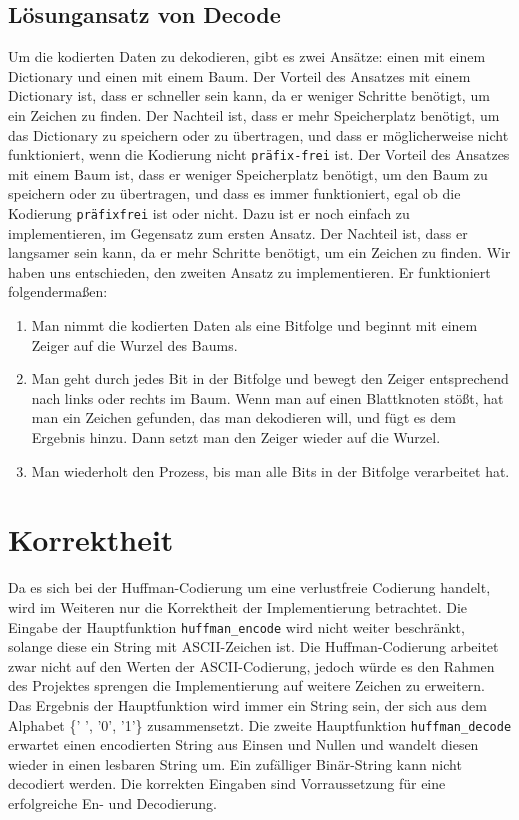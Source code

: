 \documentclass[course=erap]{aspdoc}
\begin{document}
\subsection{Lösungansatz von Decode}\label{Decode}
Um die kodierten Daten zu dekodieren, gibt es zwei Ansätze: einen mit einem Dictionary und einen mit einem Baum.
Der Vorteil des Ansatzes mit einem Dictionary ist, dass er schneller sein kann, da er weniger Schritte benötigt, um ein Zeichen zu finden. Der Nachteil ist, dass er mehr Speicherplatz benötigt, um das Dictionary zu speichern oder zu übertragen, und dass er möglicherweise nicht funktioniert, wenn die Kodierung nicht \verb+präfix-frei+ ist. Der Vorteil des Ansatzes mit einem Baum ist, dass er weniger Speicherplatz benötigt, um den Baum zu speichern oder zu übertragen, und dass es immer funktioniert, egal ob die Kodierung \verb+präfixfrei+ ist oder nicht. Dazu ist er noch einfach zu implementieren, im Gegensatz zum ersten Ansatz. Der Nachteil ist, dass er langsamer sein kann, da er mehr Schritte benötigt, um ein Zeichen zu finden.
Wir haben uns entschieden, den zweiten Ansatz zu implementieren. Er funktioniert folgendermaßen:
\begin{enumerate}
    \item Man nimmt die kodierten Daten als eine Bitfolge und beginnt mit einem Zeiger auf die Wurzel des Baums.
    \item Man geht durch jedes Bit in der Bitfolge und bewegt den Zeiger entsprechend nach links oder rechts im Baum.
Wenn man auf einen Blattknoten stößt, hat man ein Zeichen gefunden, das man dekodieren will, und fügt es dem Ergebnis hinzu. Dann setzt man den Zeiger wieder auf die Wurzel.
    \item Man wiederholt den Prozess, bis man alle Bits in der Bitfolge verarbeitet hat.
\end{enumerate}

 




\section{Korrektheit}
Da es sich bei der Huffman-Codierung um eine verlustfreie Codierung handelt, wird im Weiteren nur die Korrektheit der Implementierung  betrachtet. Die Eingabe der Hauptfunktion \verb+huffman_encode+ wird nicht weiter beschränkt, solange diese ein String mit ASCII-Zeichen ist. Die Huffman-Codierung arbeitet zwar nicht auf den Werten der ASCII-Codierung, jedoch würde es den Rahmen des Projektes sprengen die Implementierung auf weitere Zeichen zu erweitern. Das Ergebnis der Hauptfunktion wird immer ein String sein, der sich aus dem Alphabet \{' ', '0', '1'\} zusammensetzt. Die zweite Hauptfunktion \verb+huffman_decode+ erwartet einen encodierten String aus Einsen und Nullen und wandelt diesen wieder in einen lesbaren String um. Ein zufälliger Binär-String kann nicht decodiert werden. Die korrekten Eingaben sind Vorraussetzung für eine erfolgreiche En- und Decodierung.
\end{document}
